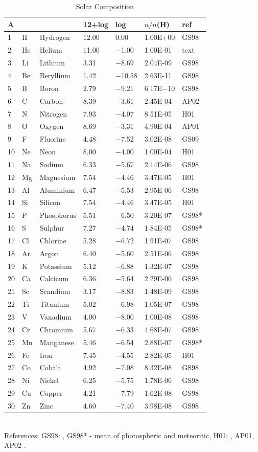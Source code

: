 \begin{table}
\centering
\caption{Solar Composition}
\label{tab:CompositionSolar}
\begin{tabular}{lllllll}
\hline
A&&&12+log& log& $n/n$(H)& ref\\
\hline
1& H& Hydrogen& 12.00& 0.00& 1.00E+00& GS98\\
2& He& Helium& 11.00& $-$1.00& 1.00E-01& text\\
3& Li& Lithium& 3.31& $-$8.69& 2.04E-09& GS98\\
4& Be& Beryllium& 1.42& $-$10.58& 2.63E-11& GS98\\
5& B& Boron& 2.79& $-$9.21& 6.17E$-$10& GS98\\
\hline
6& C& Carbon& 8.39& $-$3.61& 2.45E-04& AP02\\
7& N& Nitrogen& 7.93& $-$4.07& 8.51E-05& H01\\
8& O& Oxygen& 8.69& $-$3.31& 4.90E-04& AP01\\
9& F& Fluorine& 4.48& $-$7.52& 3.02E-08& GS09\\
10& Ne& Neon& 8.00& $-$4.00& 1.00E-04& H01\\
\hline
11& Na& Sodium& 6.33& $-$5.67& 2.14E-06& GS98\\
12& Mg& Magnesium& 7.54& $-$4.46& 3.47E-05& H01\\
13& Al& Aluminium& 6.47& $-$5.53& 2.95E-06& GS98\\
14& Si& Silicon& 7.54& $-$4.46& 3.47E-05& H01\\
15& P& Phosphorus& 5.51& $-$6.50& 3.20E-07& GS98*\\
\hline
16& S& Sulphur& 7.27& $-$4.74& 1.84E-05& GS98*\\
17& Cl& Chlorine& 5.28& $-$6.72& 1.91E-07& GS98\\
18& Ar& Argon& 6.40& $-$5.60& 2.51E-06& GS98\\
19& K& Potassium& 5.12& $-$6.88& 1.32E-07& GS98\\
20& Ca& Calcicum& 6.36& $-$5.64& 2.29E-06& GS98\\
\hline
21& Sc& Scandium& 3.17& $-$8.83& 1.48E-09& GS98\\
22& Ti& Titanium& 5.02& $-$6.98& 1.05E-07& GS98\\
23& V& Vanadium& 4.00& $-$8.00& 1.00E-08& GS98\\
24& Cr& Chromium& 5.67& $-$6.33& 4.68E-07& GS98\\
25& Mn& Manganese& 5.46& $-$6.54& 2.88E-07& GS98*\\
\hline
26& Fe& Iron& 7.45& $-$4.55& 2.82E-05& H01\\
27& Co& Cobalt& 4.92& $-$7.08& 8.32E-08& GS98\\
28& Ni& Nickel& 6.25& $-$5.75& 1.78E-06& GS98\\
29& Cu& Copper& 4.21& $-$7.79& 1.62E-08& GS98\\
30& Zn& Zinc& 4.60& $-$7.40& 3.98E-08& GS98\\
\hline
\end{tabular}\\[0.5pc]
References: GS98: \citet{Grevesse1998}, GS98* - mean of photospheric
and meteoritic, H01: \citet{Holweger2001}, AP01, AP02
\citet{Allende2001,Allende2002}.
\end{table}

